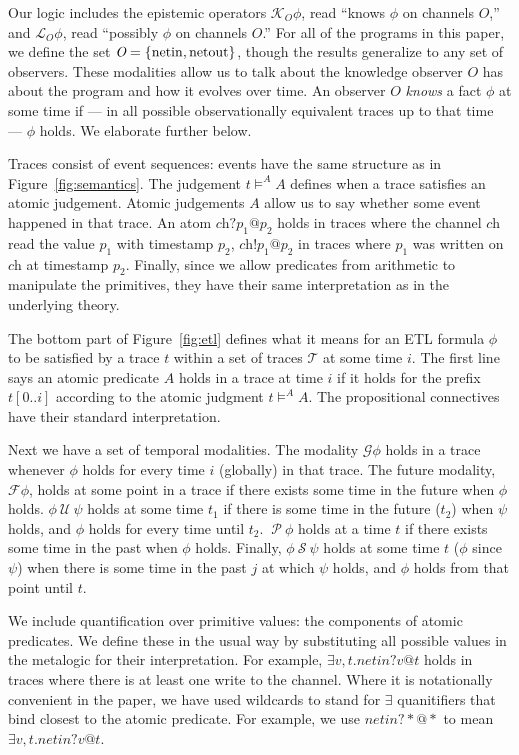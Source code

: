 \documentclass[conference]{IEEEtran}
\newcommand{\code}[1]{\text{\lstinline!#1!}}
\theoremstyle{definition}
\newcommand{\sch}{\textit{ch}}
\newcommand{\prin}{\textit{O}}
\newcommand{\atom}{A}
\newcommand{\tr}{t\xspace}
\newcommand{\tset}{\ensuremath{\mathcal{T}}\xspace}
\newcommand{\talways}{\mathcal{G}}
\newcommand{\tfuture}{\mathcal{F}}
\newcommand{\tuntil}{~\mathcal{U}~}
\newcommand{\tsince}{~\mathcal{S}~}
\newcommand{\tpast}{~\mathcal{P}~}
\newcommand{\tknows}[1]{\mathcal{K}_{#1}}
\newcommand{\tpossible}[1]{\mathcal{L}_{#1}}
\begin{document}
Our logic includes the epistemic operators $\tknows{\prin} \phi$, read
``knows $\phi$ on channels $\prin$,'' and $\tpossible{\prin} \phi$,
read ``possibly $\phi$ on channels $\prin$.'' For all of the programs
in this paper, we define the set $\prin = \{\code{netin},
\code{netout}\}$, though the results generalize to any set of observers.
These modalities allow us to talk about the
knowledge observer $\prin$ has about the program and how it evolves
over time.  An observer $\prin$ \emph{knows} a fact $\phi$ at some
time if --- in all possible observationally equivalent traces
up to that time --- $\phi$ holds.  We elaborate further
below.

Traces consist of event sequences: events have the same structure as
in Figure~\ref{fig:semantics}.  The judgement $\tr \models^A A$
defines when a trace satisfies an atomic judgement. Atomic judgements
$\atom$ allow us to say whether some event happened in that trace.  An
atom $\sch?p_1@p_2$ holds in traces where the channel $\sch$ read the
value $p_1$ with timestamp $p_2$, $\sch!p_1@p_2$ in traces where $p_1$
was written on $\sch$ at timestamp $p_2$.  Finally, since we allow
predicates from arithmetic to manipulate the primitives, they have
their same interpretation as in the underlying theory.

The bottom part of Figure~\ref{fig:etl} defines what it means for an
ETL formula $\phi$ to be satisfied by a trace $\tr$ within a set of
traces $\tset$ at some time $i$.  The first line says an atomic
predicate $A$ holds in a trace at time $i$ if it holds for the prefix
$\tr[0..i]$ according to the atomic judgment $t \models^\atom A$.  The
propositional connectives have their standard interpretation.

Next we have a set of temporal modalities.  The modality $\talways
\phi$ holds in a trace whenever $\phi$ holds for every time $i$
(globally) in that trace.  The future modality, $\tfuture \phi$,
holds at some point in a trace if there exists some time in the future
when $\phi$ holds.  $\phi \tuntil \psi$ holds at some time $t_1$ if
there is some time in the future ($t_2$) when $\psi$ holds, and $\phi$
holds for every time until $t_2$.  $\tpast \phi$ holds at a time $t$
if there exists some time in the past when $\phi$ holds.  Finally,
$\phi \tsince \psi$ holds at some time $t$ ($\phi$ since $\psi$)
when there is some time in the past $j$ at which $\psi$ holds, and $\phi$
holds from that point until $t$. 

We include quantification over primitive values: the
components of atomic predicates.  We define these in the usual way by
substituting all possible values in the metalogic for their
interpretation.  For example, $\exists v, t. netin?v@t$ holds in traces
where there is at least one write to the \code{net} channel.  Where
it is notationally convenient in the paper, we have used wildcards to
stand for $\exists$ quanitifiers that bind closest to the atomic predicate.  For
example, we use $netin?*@*$ to mean $\exists v, t. netin?v@t$.
\end{document}
